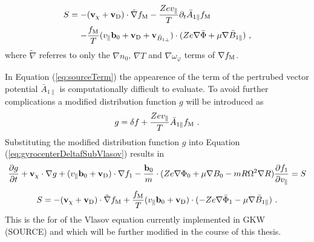 \begin{gather}
	\begin{aligned}
		S = -& (\boldsymbol{\mathbf{v}}_\chi + \boldsymbol{\mathbf{v}}_\mathrm{D}) \cdot \tilde{\nabla} f_\mathrm{M} - \frac{Z e v_\parallel}{T} \partial_t \bar{A}_{1\parallel} f_\mathrm{M} \\
		    -& \frac{f_\mathrm{M}}{T} (v_\parallel \boldsymbol{\mathbf{b}}_0 + \boldsymbol{\mathbf{v}}_\mathrm{D} + \boldsymbol{\mathbf{v}}_{\bar{B}_{1\perp}}) \cdot (Z e \nabla \bar{\Phi} + \mu \nabla \bar{B}_{1\parallel})~,
	\end{aligned}
	\label{eq:sourceTerm}
\end{gather}
where $\tilde{\nabla}$ referres to only the $\nabla n_0$, $\nabla T$ and $\nabla \omega_\varphi$ terms of $\nabla f_\mathrm{M}$. \bigskip

In Equation (\ref{eq:sourceTerm}) the appearence of the term of the pertrubed vector potential $\bar{A}_{1 \parallel}$ is computationally difficult to evaluate. To avoid further complications a modified distribution function $g$ will be introduced as
\begin{gather}
	g = \delta f + \frac{Ze v_\parallel}{T} \bar{A}_{1\parallel} f_\mathrm{M} ~.
	\label{eq:modifiedDistrubutionFunction}
\end{gather}
Substituting the modified distribution function $g$ into Equation (\ref{eq:gyrocenterDeltafSubVlasov}) results in
\begin{gather}
	\frac{\partial g}{\partial t} + \boldsymbol{\mathbf{v}}_\chi \cdot \nabla g + (v_\parallel \boldsymbol{\mathbf{b}}_0 + \boldsymbol{\mathbf{v}}_\mathrm{D}) \cdot \nabla f_1 - \frac{\boldsymbol{\mathbf{b}}_0}{m} \cdot (Z e \nabla \Phi_0 + \mu \nabla B_0 - m R \Omega^2 \nabla R) \frac{\partial f_1}{\partial v_\parallel} = S
	\label{eq:modifiedGyrocenterDeltafSubVlasov}
\end{gather}
\begin{gather}
	S = - (\boldsymbol{\mathbf{v}}_\chi + \boldsymbol{\mathbf{v}}_\mathrm{D}) \cdot \tilde{\nabla} f_\mathrm{M} + \frac{f_\mathrm{M}}{T} (v_\parallel \boldsymbol{\mathbf{b}}_0 + \boldsymbol{\mathbf{v}}_\mathrm{D}) \cdot (-Ze \nabla \bar{\Phi}_1 - \mu \nabla \bar{B}_{1\parallel}) ~.
	\label{eq:modifiedSourceTerm}
\end{gather}
This is the for of the Vlasov equation currently implemented in GKW (SOURCE) and which will be further modified in the course of this thesis.